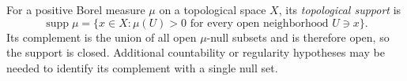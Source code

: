 
For a positive Borel measure $\mu$ on a topological space $X$, its \emph{topological support} is
\[
\operatorname{supp}\mu=\{x\in X:\mu(U)>0\text{ for every open neighborhood }U\ni x\}.
\]
Its complement is the union of all open $\mu$-null subsets and is therefore open, so the support is closed. Additional countability or regularity hypotheses may be needed to identify its complement with a single null set.
